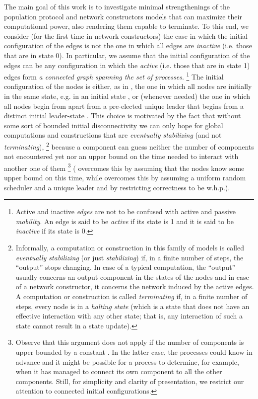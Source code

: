 \documentclass[preprint]{elsarticle}
\begin{document}
The main goal of this work is to investigate minimal strengthenings of the population protocol and network constructors models that can maximize their computational power, also rendering them capable to terminate. To this end, we consider (for the first time in network constructors) the case in which the initial configuration of the edges is not the one in which all edges are \emph{inactive} (i.e. those that are in state 0). In particular, we assume that the initial configuration of the edges can be any configuration in which the \emph{active} (i.e. those that are in state 1) edges form \emph{a connected graph spanning the set of processes}. \footnote{Active and inactive \emph{edges} are not to be confused with active and passive \emph{mobility}. An edge is said to be \emph{active} if its state is 1 and it is said to be \emph{inactive} if its state is 0.} The initial configuration of the nodes is either, as in \cite{MS14}, the one in which all nodes are initially in the same state, e.g. in an initial state , or (whenever needed) the one in which all nodes begin from  apart from a pre-elected unique leader that begins from a distinct initial leader-state . This choice is motivated by the fact that without some sort of bounded initial disconnectivity we can only hope for global computations and constructions that are \emph{eventually stabilizing} (and not \emph{terminating}), \footnote{Informally, a computation or construction in this family of models is called \emph{eventually stabilizing} (or just \emph{stabilizing}) if, in a finite number of steps, the ``output'' stops changing. In case of a typical computation, the  ``output'' usually concerns an output component in the states of the nodes and in case of a network constructor, it concerns the network induced by the active edges. A computation or construction is called \emph{terminating} if, in a finite number of steps, every node is in a \emph{halting state} (which is a state that does not have an effective interaction with any other state; that is, any interaction of such a state cannot result in a state update).} because a component can guess neither the number of components not encountered yet nor an upper bound on the time needed to interact with another one of them \footnote{Observe that this argument does not apply if the number of components is upper bounded by a constant . In the latter case, the processes could know  in advance and it might be possible for a process to determine, for example, when it has managed to connect its own component to all the other components. Still, for simplicity and clarity of presentation, we restrict our attention to connected initial configurations.}  (\cite{MS15} overcomes this by assuming that the nodes know some upper bound on this time, while \cite{Mi15} overcomes this by assuming a uniform random scheduler and a unique leader and by restricting correctness to be w.h.p.). 
\end{document}
